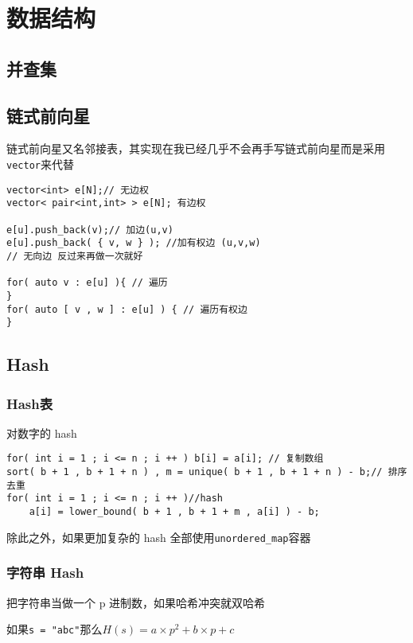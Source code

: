 \chapter{数据结构}

\section{并查集}



\section{链式前向星}
链式前向星又名邻接表，其实现在我已经几乎不会再手写链式前向星而是采用\verb|vector|来代替
\begin{lstlisting}
vector<int> e[N];// 无边权
vector< pair<int,int> > e[N]; 有边权

e[u].push_back(v);// 加边(u,v)
e[u].push_back( { v, w } ); //加有权边 (u,v,w)
// 无向边 反过来再做一次就好

for( auto v : e[u] ){ // 遍历
}
for( auto [ v , w ] : e[u] ) { // 遍历有权边
}

\end{lstlisting}

\section{Hash}
\subsection{Hash表}
对数字的 hash
\begin{lstlisting}
for( int i = 1 ; i <= n ; i ++ ) b[i] = a[i]; // 复制数组
sort( b + 1 , b + 1 + n ) , m = unique( b + 1 , b + 1 + n ) - b;// 排序去重
for( int i = 1 ; i <= n ; i ++ )//hash
    a[i] = lower_bound( b + 1 , b + 1 + m , a[i] ) - b;
\end{lstlisting}
除此之外，如果更加复杂的 hash 全部使用\verb|unordered_map|容器
\subsection{字符串 Hash}
把字符串当做一个 p 进制数，如果哈希冲突就双哈希

如果\verb|s = "abc"|那么$H(s) = a\times p^2 + b\times p + c $






